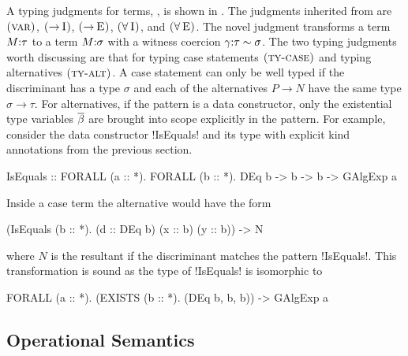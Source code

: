 \documentclass[screen,nonacm]{acmart}
\begin{document}
A typing judgments for terms, \fbox{$\Typing \TEnv \Tm \tau$}, is shown in . The judgments inherited from \SF are $\textsc{(var)}$, $\textsc{(\ensuremath{\mathord{\to}}\!~I)}$, $\textsc{(\ensuremath{\mathord{\to}}\!~E)}$, $\textsc{(\ensuremath{\mathord{\forall}}\!~I)}$, and $\textsc{(\ensuremath{\mathord{\forall}}\!~E)}$. The novel judgment  transforms a term $M{:}\tau$ to a term $M{:}\sigma$ with a witness coercion $\gamma{:}\tau\sim\sigma$. The two typing judgments worth discussing are that for typing case statements $\textsc{(ty-case)}$ and typing alternatives $\textsc{(ty-alt)}$. A case statement can only be well typed if the discriminant has a type $\sigma$ and each of the alternatives $P \to N$ have the same type $\sigma \to \tau$. For alternatives, if the pattern is a data constructor, only the existential type variables $\overline{\beta}$ are brought into scope explicitly in the pattern. 
For example, consider the data constructor !IsEquals! and its type with explicit kind annotations from the previous section.
\begin{CenteredBox}
\begin{code}
IsEquals :: FORALL (a :: *). FORALL (b :: *). DEq b -> b -> b -> GAlgExp a
\end{code}
\end{CenteredBox}

Inside a case term the alternative would have the form

\begin{CenteredBox}
\begin{code}
(IsEquals (b :: *). (d :: DEq b) (x :: b) (y :: b)) -> N
\end{code}
\end{CenteredBox}

where $N$ is the resultant if the discriminant matches the pattern !IsEquals!.
This transformation is sound as the type of !IsEquals! is isomorphic to

\begin{CenteredBox}
\begin{code}
FORALL (a :: *). (EXISTS (b :: *). (DEq b, b, b)) -> GAlgExp a
\end{code}
\end{CenteredBox}

\subsection{Operational Semantics}\label{sec:sfc-op-sem}
\newcommand{\Beta}{
 \ib{\irule[\trule{$\beta$}]
 {};
 {$\stepsto {(\Lam {x\co\tau} M) \App N} {\Set{x\mapsto N}M}$}
 }
}
\newcommand{\TBeta}{
 \ib{\irule[\trule{Ty-$\beta$}]
 {};
 {$\stepsto {(\TLam \TyVar M) \App \tau} {\Set{\TyVar\mapsto \tau}M}$}
 }
}
\newcommand{\CaseE}{
 \ib{\irule[\trule{case}]
 {};
 {\stepsto {\Case {(K \many\sigma\many\phi\many\Tm)} {\Set{...; K\App\many\beta\App\many x \to N; ...}}} {\Set{\many {\beta\mapsto\phi}, \many{x\mapsto\Tm}}N}}
 }
}
\newcommand{\CoTransE}{
 \ib{\irule[\trule{Co-Trans}]
 {};
 {$\stepsto {\Cast {(\Cast \Val \Co)} {\nu}} {\Cast \Val {(\trans{\Co} {\nu})}}$}
 }
}
\end{document}
